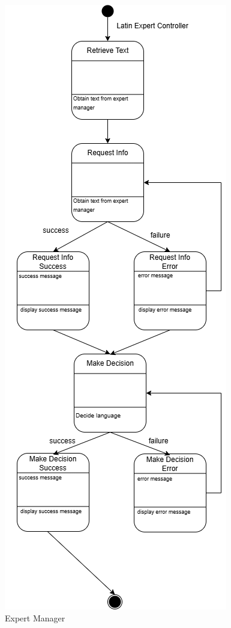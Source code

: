 \begin{figure}[H]
	\centering
	\includegraphics[width=\linewidth]{Section2/latin_expert_state_diagram.png}
	\caption{Expert Manager}
	\label{ExpertManager}
\end{figure}